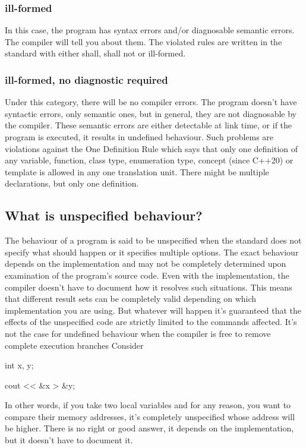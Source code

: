 \documentclass{report}
\begin{document}
\subsubsection{ill-formed}
\bigbreak \noindent 
In this case, the program has syntax errors and/or diagnosable
semantic errors. The compiler will tell you about them. The violated
rules are written in the standard with either shall, shall not or
ill-formed.

\bigbreak \noindent 
\subsubsection{ill-formed, no diagnostic required}
\bigbreak \noindent 
Under this category, there will be no compiler errors. The program
doesn’t have syntactic errors, only semantic ones, but in general,
they are not diagnosable by the compiler.
\bigbreak \noindent 
These semantic errors are either detectable at link time, or if the
program is executed, it results in undefined behaviour.
\bigbreak \noindent 
Such problems are violations against the One Definition Rule which
says that only one definition of any variable, function, class type,
enumeration type, concept (since C++20) or template is allowed in
any one translation unit. There might be multiple declarations, but
only one definition.

\bigbreak \noindent 
\subsection{What is unspecified behaviour?}
\bigbreak \noindent 
The behaviour of a program is said to be unspecified when the
standard does not specify what should happen or it specifies multiple options. The exact behaviour depends on the implementation
and may not be completely determined upon examination of the
program’s source code.
\bigbreak \noindent 
Even with the implementation, the compiler doesn’t have to document how it resolves such situations.
\bigbreak \noindent 
This means that different result sets can be completely valid depending on which implementation you are using.
\bigbreak \noindent 
But whatever will happen it’s guaranteed that the effects of the
unspecified code are strictly limited to the commands affected. It’s
not the case for undefined behaviour when the compiler is free to
remove complete execution branches
\bigbreak \noindent 
Consider
\bigbreak \noindent 
\begin{cppcode}
int x, y;

cout << &x > &y;
\end{cppcode}
\bigbreak \noindent 
In other words, if you take two local variables and for any reason,
you want to compare their memory addresses, it’s completely
unspecified whose address will be higher. There is no right or good
answer, it depends on the implementation, but it doesn’t have to
document it.
\bigbreak \noindent 
\end{document}
